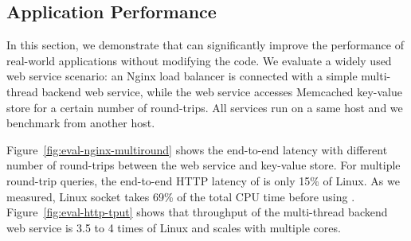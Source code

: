\subsection{Application Performance}
\label{subsec:application}


In this section, we demonstrate that \sys{} can significantly improve the performance of real-world applications without modifying the code.
We evaluate a widely used web service scenario: an Nginx load balancer is connected with a simple multi-thread backend web service, while the web service accesses Memcached key-value store for a certain number of round-trips. All services run on a same host and we benchmark from another host.

Figure~\ref{fig:eval-nginx-multiround} shows the end-to-end latency with different number of round-trips between the web service and key-value store.
For multiple round-trip queries, the end-to-end HTTP latency of \sys{} is only 15\% of Linux.
As we measured, Linux socket takes 69\% of the total CPU time before using \libipc.
Figure~\ref{fig:eval-http-tput} shows that \sys{} throughput of the multi-thread backend web service is 3.5 to 4 times of Linux and scales with multiple cores.









